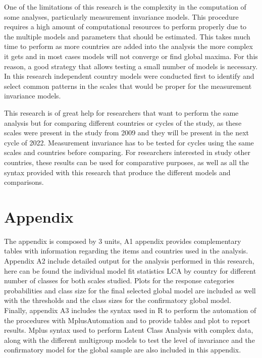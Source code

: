 \documentclass[12pt,a4paper,oneside]{reedthesis}
\begin{document}
One of the limitations of this research is the complexity in the computation of some analyses, particularly measurement invariance models. This procedure requires a high amount of computational resources to perform properly due to the multiple models and parameters that should be estimated. This takes much time to perform as more countries are added into the analysis the more complex it gets and in most cases models will not converge or find global maxima. For this reason, a good strategy that allows testing a small number of models is necessary. In this research independent country models were conducted first to identify and select common patterns in the scales that would be proper for the measurement invariance models.

This research is of great help for researchers that want to perform the same analysis but for comparing different countries or cycles of the study, as these scales were present in the study from 2009 and they will be present in the next cycle of 2022. Measurement invariance has to be tested for cycles using the same scales and countries before comparing. For researchers interested in study other countries, these results can be used for comparative purposes, as well as all the syntax provided with this research that produce the different models and comparisons.

\appendix

\hypertarget{appendix}{%
\chapter{Appendix}\label{appendix}}

The appendix is composed by 3 units, A1 appendix provides complementary tables with information regarding the items and countries used in the analysis.\\
Appendix A2 include detailed output for the analysis performed in this research, here can be found the individual model fit statistics LCA by country for different number of classes for both scales studied. Plots for the response categories probabilities and class size for the final selected global model are included as well with the thresholds and the class sizes for the confirmatory global model.\\
Finally, appendix A3 includes the syntax used in R to perform the automation of the procedures with MplusAutomation and to provide tables and plot to report results. Mplus syntax used to perform Latent Class Analysis with complex data, along with the different multigroup models to test the level of invariance and the confirmatory model for the global sample are also included in this appendix.
\end{document}
